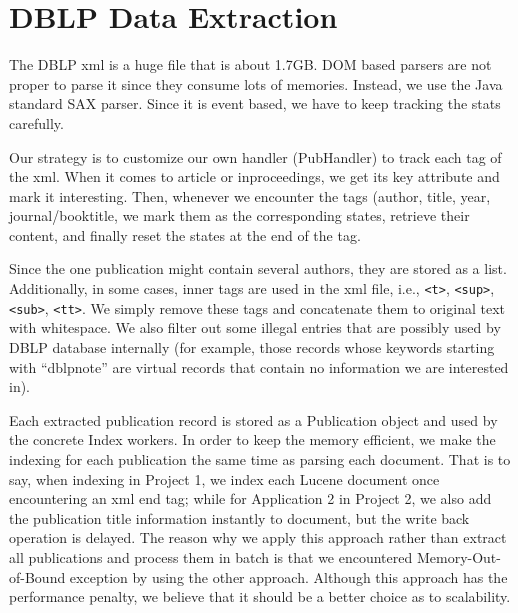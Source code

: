 \section{DBLP Data Extraction}\label{sec:extraction}

The DBLP xml is a huge file that is about 1.7GB. DOM based parsers are not proper to parse it since they consume lots of memories. Instead, we use the Java standard SAX parser. Since it is event based, we have to keep tracking the stats carefully.

Our strategy is to customize our own handler (\textsf{PubHandler}) to track each tag of the xml. When it comes to \textsf{article} or \textsf{inproceedings}, we get its \textsf{key} attribute and mark it interesting.  Then,  whenever we encounter the tags (\textsf{author}, \textsf{title}, \textsf{year}, \textsf{journal}/\textsf{booktitle}, we mark them as the corresponding states, retrieve their content, and finally reset the states at the end of the tag.

Since the one publication might contain several authors, they are stored as a list. Additionally, in some cases, inner tags are used in the xml file, i.e., \verb|<t>|, \verb|<sup>|, \verb|<sub>|, \verb|<tt>|. We simply remove these tags and concatenate them to original text with whitespace. We also filter out some illegal entries that are possibly used by DBLP database internally (for example, those records whose keywords starting with ``dblpnote'' are virtual records that contain no information we are interested in).

Each extracted publication record is stored as a \textsf{Publication} object and used by the concrete Index workers. In order to keep the memory efficient, we make the indexing for each publication the same time as parsing each document. That is to say, when indexing in Project 1, we index each Lucene document once encountering an xml end tag; while for Application 2 in Project 2, we also add the publication title information instantly to document, but the write back operation is delayed. The reason why we apply this approach rather than extract all publications and process them in batch is that we encountered Memory-Out-of-Bound exception by using the other approach. Although this approach has the performance penalty, we believe that it should be a better choice as to scalability.
